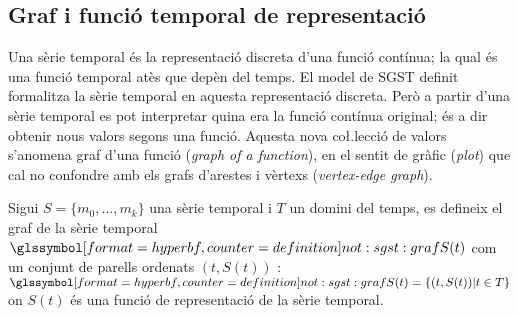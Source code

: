 




\subsection{Graf i funció temporal de representació}
\label{sec:model:repr}


Una sèrie temporal és la representació discreta d'una funció contínua;
la qual és una funció temporal atès que depèn del temps. El model de
\gls{SGST} definit formalitza la sèrie temporal en aquesta
representació discreta. Però a partir d'una sèrie temporal es pot
interpretar quina era la funció contínua original; és a dir obtenir
nous valors segons una funció. Aquesta nova co\l.lecció de valors
s'anomena graf d'una funció (\emph{graph of a function}), en el sentit
de gràfic (\emph{plot}) que cal no confondre amb els grafs d'arestes i
vèrtexs (\emph{vertex-edge graph}).



\begin{definition}%
  Sigui $S=\{m_0,\ldots,m_k\}$ una sèrie temporal i $T$ un domini del
  temps, es defineix el graf de la sèrie temporal
  $\glssymboldef{not:sgst:graf} S(t)$ com un conjunt de parells
  ordenats $(t,S(t))$ : $\glssymboldef{not:sgst:graf} S(t) = \{ (t,S(t)) |
  t\in T \}$  on $S(t)$ és una funció de representació de la sèrie
  temporal.
\end{definition}



